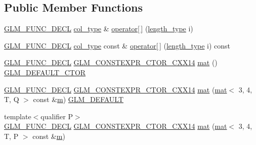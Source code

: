 \subsection*{Public Member Functions}
\begin{DoxyCompactItemize}
\item 
\mbox{\hyperlink{setup_8hpp_ab2d052de21a70539923e9bcbf6e83a51}{G\+L\+M\+\_\+\+F\+U\+N\+C\+\_\+\+D\+E\+CL}} \mbox{\hyperlink{structglm_1_1mat_3_013_00_014_00_01_t_00_01_q_01_4_aaa23c4674cbe2dc1eda1d826b8ef721e}{col\+\_\+type}} \& \mbox{\hyperlink{structglm_1_1mat_3_013_00_014_00_01_t_00_01_q_01_4_a2cc3ce3e5d6807a9ec433b51f16ecd8a}{operator\mbox{[}$\,$\mbox{]}}} (\mbox{\hyperlink{structglm_1_1mat_3_013_00_014_00_01_t_00_01_q_01_4_a6a07c3870b8e6d4ba5f1ec8fa988d9bf}{length\+\_\+type}} i)
\item 
\mbox{\hyperlink{setup_8hpp_ab2d052de21a70539923e9bcbf6e83a51}{G\+L\+M\+\_\+\+F\+U\+N\+C\+\_\+\+D\+E\+CL}} \mbox{\hyperlink{structglm_1_1mat_3_013_00_014_00_01_t_00_01_q_01_4_aaa23c4674cbe2dc1eda1d826b8ef721e}{col\+\_\+type}} const  \& \mbox{\hyperlink{structglm_1_1mat_3_013_00_014_00_01_t_00_01_q_01_4_a1abef793b9078730b053df8ff6a37256}{operator\mbox{[}$\,$\mbox{]}}} (\mbox{\hyperlink{structglm_1_1mat_3_013_00_014_00_01_t_00_01_q_01_4_a6a07c3870b8e6d4ba5f1ec8fa988d9bf}{length\+\_\+type}} i) const
\item 
\mbox{\hyperlink{setup_8hpp_ab2d052de21a70539923e9bcbf6e83a51}{G\+L\+M\+\_\+\+F\+U\+N\+C\+\_\+\+D\+E\+CL}} \mbox{\hyperlink{setup_8hpp_a0900f9145e68bf6061b6f5e7be3fa751}{G\+L\+M\+\_\+\+C\+O\+N\+S\+T\+E\+X\+P\+R\+\_\+\+C\+T\+O\+R\+\_\+\+C\+X\+X14}} \mbox{\hyperlink{structglm_1_1mat_3_013_00_014_00_01_t_00_01_q_01_4_ab9511e49e913947be5af4f97b0703de7}{mat}} () \mbox{\hyperlink{setup_8hpp_afb97a4e995bc004c0cbbfa22125b80ba}{G\+L\+M\+\_\+\+D\+E\+F\+A\+U\+L\+T\+\_\+\+C\+T\+OR}}
\item 
\mbox{\hyperlink{setup_8hpp_ab2d052de21a70539923e9bcbf6e83a51}{G\+L\+M\+\_\+\+F\+U\+N\+C\+\_\+\+D\+E\+CL}} \mbox{\hyperlink{setup_8hpp_a0900f9145e68bf6061b6f5e7be3fa751}{G\+L\+M\+\_\+\+C\+O\+N\+S\+T\+E\+X\+P\+R\+\_\+\+C\+T\+O\+R\+\_\+\+C\+X\+X14}} \mbox{\hyperlink{structglm_1_1mat_3_013_00_014_00_01_t_00_01_q_01_4_a7c4d69ea49d8271382c7d08e14c16a25}{mat}} (\mbox{\hyperlink{structglm_1_1mat}{mat}}$<$ 3, 4, T, Q $>$ const \&\mbox{\hyperlink{_s_d_l__opengl__glext_8h_af593500c283bf1a787a6f947f503a5c2}{m}}) \mbox{\hyperlink{setup_8hpp_aefce7051c376a64ba89fa93a9f63bc2c}{G\+L\+M\+\_\+\+D\+E\+F\+A\+U\+LT}}
\item 
{\footnotesize template$<$qualifier P$>$ }\\\mbox{\hyperlink{setup_8hpp_ab2d052de21a70539923e9bcbf6e83a51}{G\+L\+M\+\_\+\+F\+U\+N\+C\+\_\+\+D\+E\+CL}} \mbox{\hyperlink{setup_8hpp_a0900f9145e68bf6061b6f5e7be3fa751}{G\+L\+M\+\_\+\+C\+O\+N\+S\+T\+E\+X\+P\+R\+\_\+\+C\+T\+O\+R\+\_\+\+C\+X\+X14}} \mbox{\hyperlink{structglm_1_1mat_3_013_00_014_00_01_t_00_01_q_01_4_a04c8fa43e36e082b099a3c7603ad8453}{mat}} (\mbox{\hyperlink{structglm_1_1mat}{mat}}$<$ 3, 4, T, P $>$ const \&\mbox{\hyperlink{_s_d_l__opengl__glext_8h_af593500c283bf1a787a6f947f503a5c2}{m}})

\end{DoxyCompactItemize}
